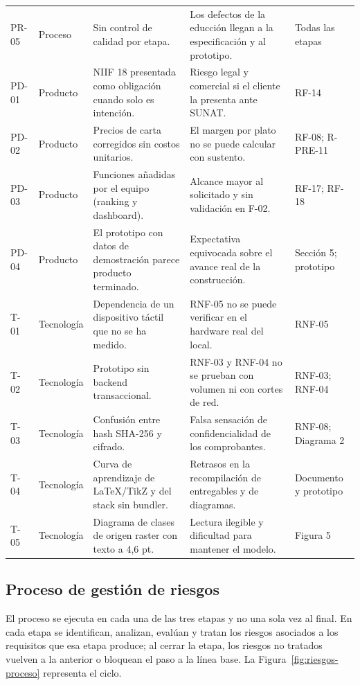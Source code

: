 {\begin{longtable}{L{1.3cm} L{1.7cm} L{4.2cm} L{5.4cm} L{2.3cm}}
PR-05 & Proceso & Sin control de calidad por etapa. & Los defectos de la educción llegan a la especificación y al prototipo. & Todas las etapas \\
PD-01 & Producto & NIIF 18 presentada como obligación cuando solo es intención. & Riesgo legal y comercial si el cliente la presenta ante SUNAT. & RF-14 \\
PD-02 & Producto & Precios de carta corregidos sin costos unitarios. & El margen por plato no se puede calcular con sustento. & RF-08; R-PRE-11 \\
PD-03 & Producto & Funciones añadidas por el equipo (ranking y dashboard). & Alcance mayor al solicitado y sin validación en F-02. & RF-17; RF-18 \\
PD-04 & Producto & El prototipo con datos de demostración parece producto terminado. & Expectativa equivocada sobre el avance real de la construcción. & Sección 5; prototipo \\
T-01 & Tecnología & Dependencia de un dispositivo táctil que no se ha medido. & RNF-05 no se puede verificar en el hardware real del local. & RNF-05 \\
T-02 & Tecnología & Prototipo sin backend transaccional. & RNF-03 y RNF-04 no se prueban con volumen ni con cortes de red. & RNF-03; RNF-04 \\
T-03 & Tecnología & Confusión entre hash SHA-256 y cifrado. & Falsa sensación de confidencialidad de los comprobantes. & RNF-08; Diagrama 2 \\
T-04 & Tecnología & Curva de aprendizaje de LaTeX/TikZ y del stack sin bundler. & Retrasos en la recompilación de entregables y de diagramas. & Documento y prototipo \\
T-05 & Tecnología & Diagrama de clases de origen raster con texto a 4,6 pt. & Lectura ilegible y dificultad para mantener el modelo. & Figura 5 \\
\end{longtable}
}

\subsection{Proceso de gestión de riesgos}
\label{subsec:riesgos-proceso}

El proceso se ejecuta en cada una de las tres etapas y no una sola vez al
final. En cada etapa se identifican, analizan, evalúan y tratan los riesgos
asociados a los requisitos que esa etapa produce; al cerrar la etapa, los
riesgos no tratados vuelven a la anterior o bloquean el paso a la línea
base. La Figura~\ref{fig:riesgos-proceso} representa el ciclo.

